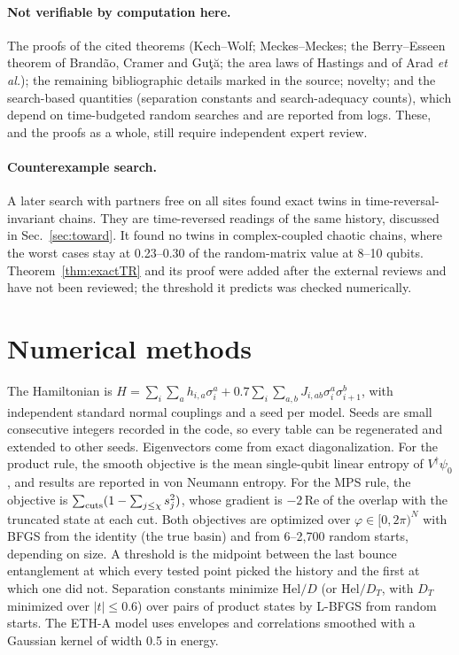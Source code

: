 \documentclass[11pt]{article}
\theoremstyle{definition}
\theoremstyle{remark}
\newcommand{\Hel}{\mathrm{Hel}}
\begin{document}
\paragraph{Not verifiable by computation here.} The proofs of the cited theorems (Kech--Wolf; Meckes--Meckes; the Berry--Esseen theorem of Brand\~ao, Cramer and Gu\c{t}\u{a}; the area laws of Hastings and of Arad \emph{et al.}); the remaining bibliographic details marked in the source; novelty; and the search-based quantities (separation constants and search-adequacy counts), which depend on time-budgeted random searches and are reported from logs. These, and the proofs as a whole, still require independent expert review.

\paragraph{Counterexample search.} A later search with partners free on all sites found exact twins in time-reversal-invariant chains. They are time-reversed readings of the same history, discussed in Sec.~\ref{sec:toward}. It found no twins in complex-coupled chaotic chains, where the worst cases stay at 0.23--0.30 of the random-matrix value at 8--10 qubits. Theorem~\ref{thm:exactTR} and its proof were added after the external reviews and have not been reviewed; the threshold it predicts was checked numerically.

\section{Numerical methods}
\label{app:numerics}

The Hamiltonian is $H=\sum_i\sum_a h_{i,a}\sigma^a_i+0.7\sum_i\sum_{a,b}J_{i,ab}\sigma^a_i\sigma^b_{i+1}$, with independent standard normal couplings and a seed per model. Seeds are small consecutive integers recorded in the code, so every table can be regenerated and extended to other seeds. Eigenvectors come from exact diagonalization. For the product rule, the smooth objective is the mean single-qubit linear entropy of $V^\dagger\psi_0$, and results are reported in von Neumann entropy. For the MPS rule, the objective is $\sum_{\rm cuts}(1-\sum_{j\le\chi}s_j^2)$, whose gradient is $-2\,\mathrm{Re}$ of the overlap with the truncated state at each cut. Both objectives are optimized over $\varphi\in[0,2\pi)^N$ with BFGS from the identity (the true basin) and from 6--2{,}700 random starts, depending on size. A threshold is the midpoint between the last bounce entanglement at which every tested point picked the history and the first at which one did not. Separation constants minimize $\Hel/D$ (or $\Hel/D_T$, with $D_T$ minimized over $|t|\le0.6$) over pairs of product states by L-BFGS from random starts. The ETH-A model uses envelopes and correlations smoothed with a Gaussian kernel of width 0.5 in energy.
\end{document}
